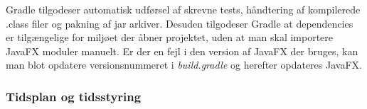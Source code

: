 Gradle tilgodeser automatisk udførsel af skrevne tests, håndtering af kompilerede .class filer og pakning af jar arkiver. Desuden tilgodeser Gradle at dependencies er tilgængelige for miljøet der åbner projektet, uden at man skal importere JavaFX moduler manuelt. Er der en fejl i den version af JavaFX der bruges, kan man blot opdatere versionsnummeret i \emph{build.gradle} og herefter opdateres JavaFX.

\subsubsection{Tidsplan og tidsstyring}